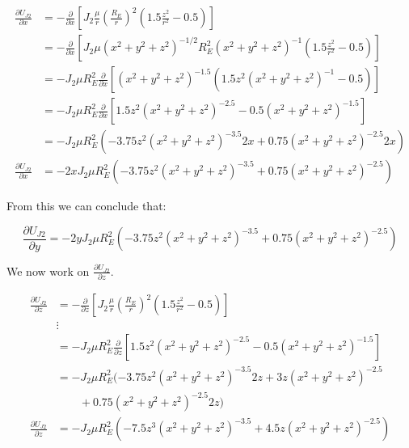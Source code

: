 \documentclass[11pt]{article}
\begin{document}
\begin{align}
	\frac{\partial U_{J2}}{\partial x} & = - \frac{\partial}{\partial x} \left[ J_2 \frac{\mu}{r} \left( \frac{R_E}{r} \right)^2 \left( 1.5 \frac{z^2}{r^2} - 0.5\right) \right] \\
	& = - \frac{\partial}{\partial x} \left[ J_2 \mu \left( x^2 + y^2 + z^2\right)^{-1/2} R_E^2 \left( x^2 + y^2 + z^2\right)^{-1} \left( 1.5 \frac{z^2}{r^2} - 0.5\right) \right] \\
	& = - J_2 \mu R_E^2 \frac{\partial}{\partial x} \left[ \left( x^2 + y^2 + z^2\right)^{-1.5} \left( 1.5 z^2 \left( x^2 + y^2 + z^2\right)^{-1}  - 0.5\right) \right] \\
	& = - J_2 \mu R_E^2 \frac{\partial}{\partial x} \left[ 1.5 z^2 \left( x^2 + y^2 + z^2\right)^{-2.5} - 0.5 \left( x^2 + y^2 + z^2\right)^{-1.5} \right] \\
	& = - J_2 \mu R_E^2 \left( -3.75 z^2 \left( x^2 + y^2 + z^2\right)^{-3.5} 2x + 0.75 \left( x^2 + y^2 + z^2\right)^{-2.5} 2x \right) \\
	\frac{\partial U_{J2}}{\partial x} & = - 2 x J_2 \mu R_E^2 \left( -3.75 z^2 \left( x^2 + y^2 + z^2\right)^{-3.5} + 0.75 \left( x^2 + y^2 + z^2\right)^{-2.5} \right)
\end{align}

From this we can conclude that:

\begin{equation}
	\frac{\partial U_{J2}}{\partial y} = - 2 y J_2 \mu R_E^2 \left( -3.75 z^2 \left( x^2 + y^2 + z^2\right)^{-3.5} + 0.75 \left( x^2 + y^2 + z^2\right)^{-2.5} \right)
\end{equation}

We now work on $\frac{\partial U_{J2}}{\partial z}$.

\begin{align}
	\frac{\partial U_{J2}}{\partial z} & = - \frac{\partial}{\partial z} \left[ J_2 \frac{\mu}{r} \left( \frac{R_E}{r} \right)^2 \left( 1.5 \frac{z^2}{r^2} - 0.5\right) \right] \\
	& \vdots \nonumber \\
	& = - J_2 \mu R_E^2 \frac{\partial}{\partial z} \left[ 1.5 z^2 \left( x^2 + y^2 + z^2\right)^{-2.5} - 0.5 \left( x^2 + y^2 + z^2\right)^{-1.5} \right] \\
	& = - J_2 \mu R_E^2 (  -3.75 z^2 \left( x^2 + y^2 + z^2\right)^{-3.5} 2z + 3z\left( x^2 + y^2 + z^2\right)^{-2.5} \nonumber \\
	& \quad \quad + 0.75 \left( x^2 + y^2 + z^2\right)^{-2.5} 2z ) \\
	\frac{\partial U_{J2}}{\partial z} &= - J_2 \mu R_E^2 \left(  -7.5 z^3 \left( x^2 + y^2 + z^2\right)^{-3.5} + 4.5z\left( x^2 + y^2 + z^2\right)^{-2.5} \right) \\
\end{align}
\end{document}
